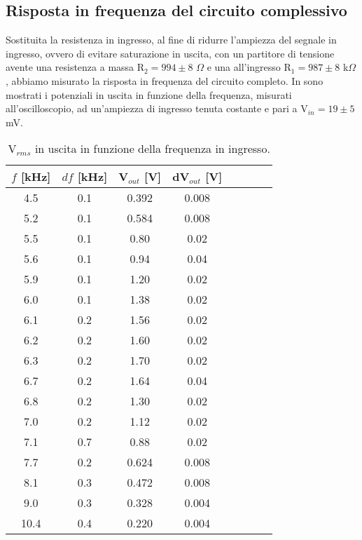 \subsection{Risposta in frequenza del circuito complessivo}
Sostituita la resistenza in ingresso, al fine di ridurre l'ampiezza del segnale in ingresso, ovvero di evitare saturazione in uscita, con un partitore di tensione avente una resistenza a massa R$_2 = 994 \pm 8$ $\Omega$ e una all'ingresso R$_1 = 987 \pm 8$ k$\Omega$, abbiamo misurato la risposta in frequenza del circuito completo. In  sono mostrati i potenziali in uscita in funzione della frequenza, misurati all'oscilloscopio, ad un'ampiezza di ingresso tenuta costante e pari a V$_{in} = 19 \pm 5$ mV.\\
\begin{table}[h]
	\centering
	\begin{tabular}{cccccccc}		
		 {$f$ [kHz]}& {$df$ [kHz]}& {V$_{out}$ [V]} & {dV$_{out}$ [V]}\\
		 \midrule
                      4.5 & 0.1 & 0.392 & 0.008\\
                      5.2 & 0.1 & 0.584 & 0.008\\
                      5.5 & 0.1 & 0.80 &	0.02\\
                      5.6 & 0.1 & 0.94 & 0.04\\
                      5.9 & 0.1 & 1.20 & 0.02\\
                      6.0 & 0.1 & 1.38 & 0.02\\
                      6.1 & 0.2 & 1.56 & 0.02\\
                      6.2 & 0.2 & 1.60 & 0.02\\
                      6.3 & 0.2 & 1.70 & 0.02\\
                      6.7 & 0.2 & 1.64 & 0.04\\
                      6.8 & 0.2 & 1.30 & 0.02\\	
                      7.0 & 0.2 & 1.12 & 0.02\\
                      7.1 & 0.7 & 0.88 & 0.02\\
                      7.7 & 0.2 & 0.624 & 0.008\\
                      8.1 & 0.3 & 0.472 & 0.008\\
                      9.0 & 0.3 & 0.328 & 0.004\\
                      10.4 & 0.4 & 0.220 & 0.004\\
 	\end{tabular}
	\caption{V$_{rms}$ in uscita in funzione della frequenza in ingresso.}
	\label{t:frequenza}
\end{table}
